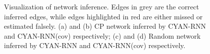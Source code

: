 \begin{figure}
\centering
{}
\caption{Visualization of network inference. Edges in grey are the correct
inferred edges, while edges highlighted in red are either missed or estimated
falsely. (a) and (b) CP network inferred by CYAN-RNN and CYAN-RNN(cov)
respectively; (c) and (d) Random network inferred by CYAN-RNN and CYAN-RNN(cov)
respectively.
}
\end{figure}




